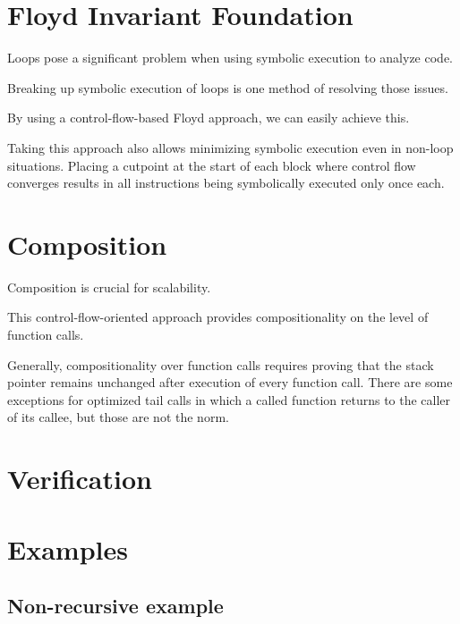 \section{Floyd Invariant Foundation}\label{se:cfg_invariant}

Loops pose a significant problem when using symbolic execution to analyze code.

Breaking up symbolic execution of loops is one method of resolving those issues.

By using a control-flow-based Floyd approach, we can easily achieve this.

Taking this approach also allows minimizing symbolic execution
even in non-loop situations.
Placing a cutpoint at the start of each block where control flow converges
results in all instructions being symbolically executed only once each.


\section{Composition}
Composition is crucial for scalability.

This control-flow-oriented approach provides compositionality
on the level of function calls.

Generally, compositionality over function calls requires proving
that the stack pointer remains unchanged after execution of every function call.
There are some exceptions for optimized tail calls
in which a called function returns to the caller of its callee,
but those are not the norm.


\section{Verification}\label{se:cfg_verification}

\section{Examples}\label{se:cfg_examples}
\subsection{Non-recursive example}

